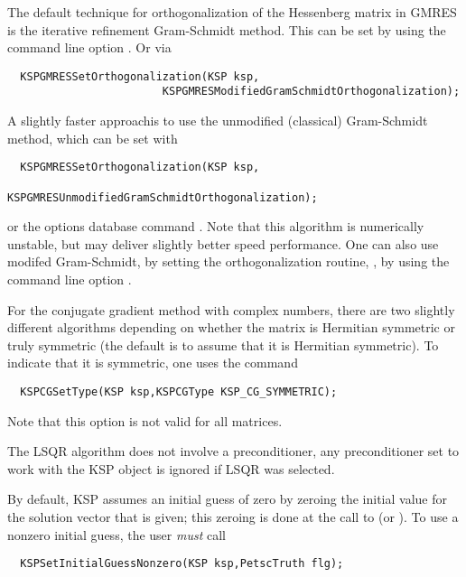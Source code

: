 The default technique for orthogonalization of the Hessenberg
matrix in GMRES is the iterative refinement Gram-Schmidt method.
 This can be set  by using the command line option 
.  Or
via 
\begin{verbatim}
  KSPGMRESSetOrthogonalization(KSP ksp,
                        KSPGMRESModifiedGramSchmidtOrthogonalization);
\end{verbatim}
A slightly
faster approachis to use the 
unmodified (classical) Gram-Schmidt method, which can be set 
with  
\begin{verbatim}
  KSPGMRESSetOrthogonalization(KSP ksp,
                        KSPGMRESUnmodifiedGramSchmidtOrthogonalization);
\end{verbatim}
or the options database 
command .
Note that this algorithm is numerically unstable, but may deliver 
slightly better speed performance. One can also use 
modifed Gram-Schmidt, 
 by setting the orthogonalization routine,
, by using the command line option 
. 

For the conjugate gradient method with complex numbers, there are two
slightly different algorithms depending on whether the matrix is 
Hermitian symmetric or truly symmetric (the default is to assume that
it is Hermitian symmetric). To indicate that it is symmetric, one uses the command
  
\begin{verbatim}
  KSPCGSetType(KSP ksp,KSPCGType KSP_CG_SYMMETRIC);
\end{verbatim}
Note that this option is not valid for all matrices.

The LSQR algorithm does not involve a preconditioner, any preconditioner
set to work with the KSP object is ignored if LSQR was selected.

By default, KSP assumes an initial guess of zero by zeroing the initial 
value for the solution vector that is given; this zeroing is done at the
call to  (or ). To use a nonzero 
initial guess, the user {\em must} call 
\begin{verbatim}
  KSPSetInitialGuessNonzero(KSP ksp,PetscTruth flg);
\end{verbatim}

